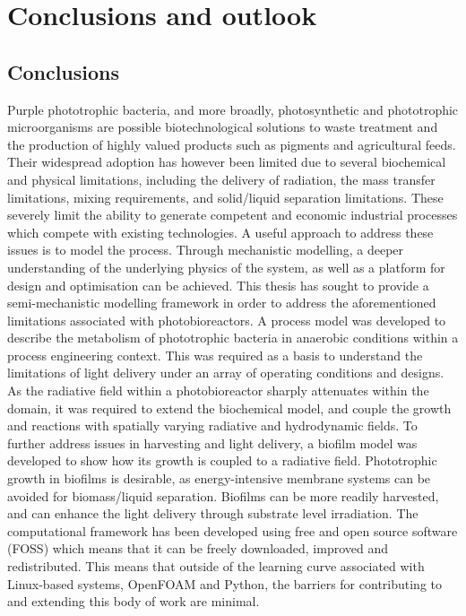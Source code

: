 \chapter[Conclusions and outlook]{Conclusions and outlook}
\label{chap:conclusion}

\section{Conclusions}
Purple phototrophic bacteria, and more broadly, photosynthetic and phototrophic microorganisms are possible biotechnological solutions to waste treatment and the production of highly valued products such as pigments and agricultural feeds. Their widespread adoption has however been limited due to several biochemical and physical limitations, including the delivery of radiation, the mass transfer limitations, mixing requirements, and solid/liquid separation limitations. These severely limit the ability to generate competent and economic industrial processes which compete with existing technologies. 
\skippingparagraph
A useful approach to address these issues is to model the process. Through mechanistic modelling, a deeper understanding of the underlying physics of the system, as well as a platform for design and optimisation can be achieved. This thesis has sought to provide a semi-mechanistic modelling framework in order to address the aforementioned limitations associated with photobioreactors. A process model was developed to describe the metabolism of phototrophic bacteria in anaerobic conditions within a process engineering context. This was required as a basis to understand the limitations of light delivery under an array of operating conditions and designs. As the radiative field within a photobioreactor sharply attenuates within the domain, it was required to extend the biochemical model, and couple the growth and reactions with spatially varying radiative and hydrodynamic fields. 
To further address issues in harvesting and light delivery, a biofilm model was developed to show how its growth is coupled to a radiative field. Phototrophic growth in biofilms is desirable, as energy-intensive membrane systems can be avoided for biomass/liquid separation. Biofilms can be more readily harvested, and can enhance the light delivery through substrate level irradiation. The computational framework has been developed using free and open source software (FOSS) which means that it can be freely downloaded, improved and redistributed. This means that outside of the learning curve associated with Linux-based systems, OpenFOAM and Python, the barriers for contributing to and extending this body of work are minimal.

